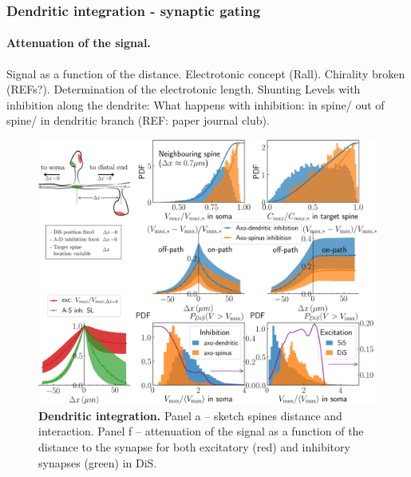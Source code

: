 \documentclass[10pt,letterpaper]{article}
\begin{document}
\subsubsection*{Dendritic integration - synaptic gating}
\paragraph*{Attenuation of the signal.} Signal as a function of the distance. Electrotonic concept (Rall). Chirality broken (REFs?). Determination of the electrotonic length. Shunting Levels with inhibition along the dendrite: What happens with inhibition: in spine/ out of spine/ 
in dendritic branch (REF: paper journal club).



\begin{figure}[htb!]
\includegraphics[width=1.0\linewidth]{f3}
\caption{{\bf Dendritic integration.}   Panel a -- sketch spines distance and interaction. Panel f -- attenuation of the signal as a function of the distance to the synapse for both excitatory (red) and inhibitory synapses (green) in DiS. 
}\label{fig:Dendritic integratio}
\end{figure}
\end{document}
